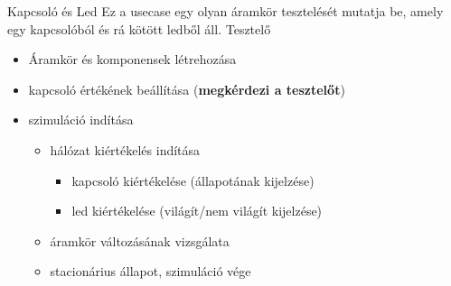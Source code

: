 \usecase
{Kapcsoló és Led}
{Ez a usecase egy olyan áramkör tesztelését mutatja be, amely egy kapcsolóból és rá kötött ledből áll.}
{Tesztelő}
{\vspace{-15pt}
\begin{itemize}
\setlength{\itemsep}{0cm}%
\setlength{\parskip}{0cm}%
\item Áramkör és komponensek létrehozása
\item kapcsoló értékének beállítása (\textbf{megkérdezi a tesztelőt})
\item szimuláció indítása
\begin{itemize}
\setlength{\itemsep}{0cm}%
\setlength{\parskip}{0cm}%
\item hálózat kiértékelés indítása
\begin{itemize}
\setlength{\itemsep}{0cm}%
\setlength{\parskip}{0cm}%
\item kapcsoló kiértékelése (állapotának kijelzése)
\item led kiértékelése (világít/nem világít kijelzése)
\end{itemize}
\item áramkör változásának vizsgálata
\item stacionárius állapot, szimuláció vége
\end{itemize}
\end{itemize}
\vspace{-15pt}}

